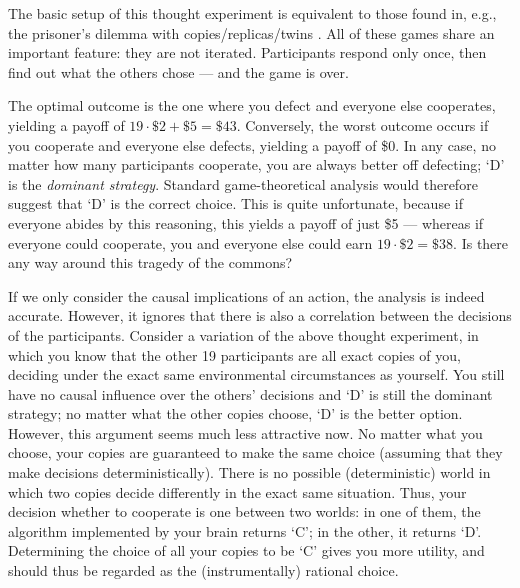 \documentclass{book}
\begin{document}
The basic setup of this thought experiment is equivalent to those found in, e.g., the prisoner’s dilemma with copies/replicas/twins \parencite{Kuhn2017-tl}. All of these games share an important feature: they are not iterated. Participants respond only once, then find out what the others chose --- and the game is over.

The optimal outcome is the one where you defect and everyone else cooperates, yielding a payoff of $19\cdot\$2+\$5=\$43$. Conversely, the worst outcome occurs if you cooperate and everyone else defects, yielding a payoff of \$0. In any case, no matter how many participants cooperate, you are always better off defecting; ‘D’ is the \textit{dominant strategy}. Standard game-theoretical analysis would therefore suggest that ‘D’ is the correct choice. This is quite unfortunate, because if everyone abides by this reasoning, this yields a payoff of just \$5 --- whereas if everyone could cooperate, you and everyone else could earn $19\cdot\$2=\$38$. Is there any way around this tragedy of the commons?
 
If we only consider the causal implications of an action, the analysis is indeed accurate. However, it ignores that there is also a correlation between the decisions of the participants. Consider a variation of the above thought experiment, in which you know that the other 19 participants are all exact copies of you, deciding under the exact same environmental circumstances as yourself. You still have no causal influence over the others’ decisions and ‘D’ is still the dominant strategy; no matter what the other copies choose, ‘D’ is the better option. However, this argument seems much less attractive now. No matter what you choose, your copies are guaranteed to make the same choice (assuming that they make decisions deterministically). There is no possible (deterministic) world in which two copies decide differently in the exact same situation. Thus, your decision whether to cooperate is one between two worlds: in one of them, the algorithm implemented by your brain returns ‘C’; in the other, it returns ‘D’. Determining the choice of all your copies to be ‘C’ gives you more utility, and should thus be regarded as the (instrumentally) rational choice.
 
\end{document}
